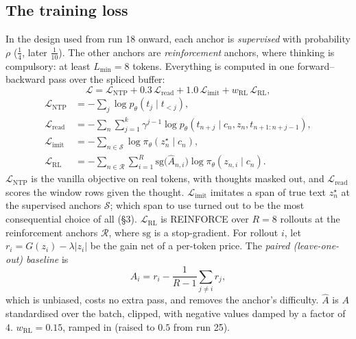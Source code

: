 \documentclass[11pt]{article}
\begin{document}
\subsection{The training loss}
In the design used from run 18 onward, each anchor is \emph{supervised} with probability $\rho$ ($\tfrac14$, later $\tfrac1{10}$). The other anchors are \emph{reinforcement} anchors, where thinking is compulsory: at least $L_{\min}=8$ tokens. Everything is computed in one forward--backward pass over the spliced buffer:
\begin{equation}
\mathcal{L}=\mathcal{L}_{\mathrm{NTP}}+0.3\,\mathcal{L}_{\mathrm{read}}+1.0\,\mathcal{L}_{\mathrm{imit}}+w_{\mathrm{RL}}\,\mathcal{L}_{\mathrm{RL}},
\end{equation}
\begin{align*}
\mathcal{L}_{\mathrm{NTP}}&=-\textstyle\sum_j\log p_\theta(t_j\mid t_{<j}),\\
\mathcal{L}_{\mathrm{read}}&=-\textstyle\sum_n\sum_{j=1}^{k}\gamma^{j-1}\log p_\theta(t_{n+j}\mid c_n,z_n,t_{n+1:n+j-1}),\\
\mathcal{L}_{\mathrm{imit}}&=-\textstyle\sum_{n\in\mathcal{S}}\log\pi_\theta(z^\star_n\mid c_n),\\
\mathcal{L}_{\mathrm{RL}}&=-\textstyle\sum_{n\in\mathcal{R}}\sum_{i=1}^{R}\mathrm{sg}\big(\hat A_{n,i}\big)\log\pi_\theta(z_{n,i}\mid c_n).
\end{align*}
$\mathcal{L}_{\mathrm{NTP}}$ is the vanilla objective on real tokens, with thoughts masked out, and $\mathcal{L}_{\mathrm{read}}$ scores the window rows given the thought. $\mathcal{L}_{\mathrm{imit}}$ imitates a span of true text $z^\star_n$ at the supervised anchors $\mathcal{S}$; which span to use turned out to be the most consequential choice of all (\S3). $\mathcal{L}_{\mathrm{RL}}$ is REINFORCE over $R=8$ rollouts at the reinforcement anchors $\mathcal{R}$, where $\mathrm{sg}$ is a stop-gradient. For rollout $i$, let $r_i=G(z_i)-\lambda|z_i|$ be the gain net of a per-token price. The \emph{paired (leave-one-out) baseline} is
\begin{equation}
A_i=r_i-\frac{1}{R-1}\sum_{j\ne i}r_j ,
\end{equation}
which is unbiased, costs no extra pass, and removes the anchor's difficulty. $\hat A$ is $A$ standardised over the batch, clipped, with negative values damped by a factor of $4$. $w_{\mathrm{RL}}=0.15$, ramped in (raised to $0.5$ from run 25).
\end{document}
